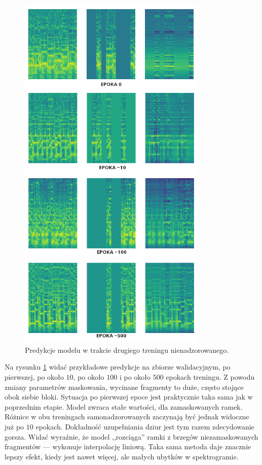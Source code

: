 \begin{figure}
    \centering
    \includegraphics[width=0.8\textwidth]{./images/mae2_predictions.png}
    \caption{Predykcje modelu w trakcie drugiego treningu nienadzorowanego.}
    \label{fig:mae2_predictions}
\end{figure}

Na rysunku \ref{fig:mae2_predictions} widać przykładowe predykcje na zbiorze walidacyjnym, po pierwszej, po około $10$, po około $100$ i po około $500$ epokach treningu. Z powodu zmiany parametrów maskowania, wycinane fragmenty to duże, często stojące obok siebie bloki. Sytuacja po pierwszej epoce jest praktycznie taka sama jak w poprzednim etapie. Model zwraca stałe wartości, dla zamaskowanych ramek. Różnice w obu treningach samonadzorowanych zaczynają być jednak widoczne już po $10$ epokach. Dokładność uzupełniania dziur jest tym razem zdecydowanie gorsza. Widać wyraźnie, że model ,,rozciąga'' ramki z brzegów niezamaskowanych fragmentów --- wykonuje interpolację liniową. Taka sama metoda daje znacznie lepszy efekt, kiedy jest nawet więcej, ale małych ubytków w spektrogramie.

